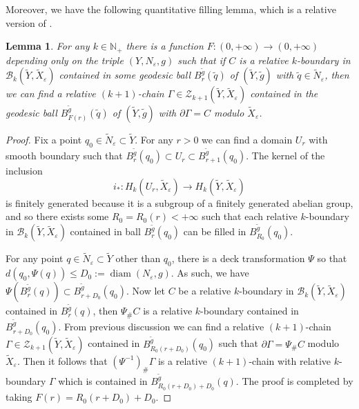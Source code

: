 \documentclass[11pt,letterpaper]{amsart}
\numberwithin{equation}{section}
\newtheorem{lemma}[theorem]{Lemma}
\theoremstyle{definition}
\DeclareMathOperator{\diam}{diam}
\newcommand{\ve}{\varepsilon}
\newcommand{\ti}[1]{\tilde{#1}}
\begin{document}
Moreover, we have the following quantitative filling lemma, which is a relative version of \cite[Proposition 10]{CL20}.
\begin{lemma}\label{Lem: quantitative filling}
For any $k\in \mathbb N_+$ there is a function $F:(0,+\infty)\to (0,+\infty)$ depending only on the triple $(Y, N_\ve, g)$ such that if $C$ is a relative $k$-boundary in $\mathcal B_k(\ti Y, \ti X_{\ve})$ contained in some geodesic ball $B_{r}^{\ti{g}}(\tilde q)$ of $(\ti Y,\tilde g)$ with $\tilde q\in \tilde N_\ve$, then we can find a relative $(k+1)$-chain $\Gamma \in \mathcal Z_{k+1}(\ti Y,  \ti X_{\ve})$ contained in the geodesic ball $B_{F(r)}^{\ti{g}}(\tilde q)$ of $(\tilde Y,\tilde g)$ with $\partial\Gamma=C$ modulo $ \ti X_{\ve}$.
\end{lemma}
\begin{proof}
Fix a point $q_0\in\tilde N_\ve\subset \tilde Y$. For any $r>0$ {we can find a domain $U_r$ with smooth boundary such that $B_{r}^{\ti{g}}(q_0) \subset U_r \subset B_{r+1}^{\ti{g}}(q_0)$}. The kernel of the inclusion
$$
i_*:H_{k}({U_r}, \tilde X_{\ve})\to H_k(\tilde Y, \tilde X_{\ve})
$$
is finitely generated {because it is a subgroup of a finitely generated abelian group,} and so there exists some $R_0=R_0(r)<+\infty$ such that each relative $k$-boundary in $\mathcal B_k(\ti Y,  \ti X_{\ve})$ contained in ball $B_{r}^{\ti{g}}(q_0)$ can be filled in $B_{R_0}^{\ti{g}}(q_0)$.

For any point $q\in \tilde N_\ve\subset \tilde Y$ other than $q_0$, there is a deck transformation $\Psi$ so that $d(q_0,\Psi(q)) \leq D_0:=\diam (N_\ve,g)$. As such, we have $\Psi(B_{r}^{\ti{g}}(q)) \subset B_{r+D_0}^{\ti{g}}(q_0)$. Now let $C$ be a relative $k$-boundary in $\mathcal B_k(\tilde Y, \tilde X_{\ve})$ contained in $B_{r}^{\ti{g}}(q)$, then $\Psi_\#C$ is a relative $k$-boundary contained in $B_{r+D_0}^{\ti{g}}(q_0)$. From previous discussion we can find a relative $(k+1)$-chain $\Gamma \in\mathcal Z_{k+1}(\tilde Y,\tilde X_{\ve})$ contained in $B_{R_0(r+D_0)}^{\ti{g}}(q_0)$ such that $\partial \Gamma=\Psi_\# C$ modulo $\tilde X_{\ve}$. Then it follows that $(\Psi^{-1})_\#\Gamma$ is a relative $(k+1)$-chain with relative $k$-boundary $\Gamma$ which is contained in $B_{R_0(r+D_0)+D_0}^{\ti{g}}(q)$. The proof is completed by taking $F(r)=R_0(r+D_0)+D_0$.
\end{proof}
\end{document}
